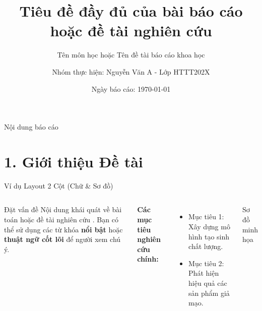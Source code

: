 \documentclass[10pt,aspectratio=169]{beamer}
\title[Tiêu đề rút gọn]{Tiêu đề đầy đủ của bài báo cáo hoặc đề tài nghiên cứu}
\subtitle{Tên môn học hoặc Tên đề tài báo cáo khoa học}
\author{Nhóm thực hiện: Nguyễn Văn A - Lớp HTTT202X}
\date{Ngày báo cáo: \today}
\newcommand{\highlight}[1]{\textcolor{accent}{\bfseries #1}}
\newcommand{\kw}[1]{\textcolor{uitblue}{\bfseries #1}}
\begin{document}
{
  \usebackgroundtemplate{}
  \begin{frame}[plain]
    \titlepage
  \end{frame}
}

\begin{frame}{Nội dung báo cáo}
\tableofcontents
\end{frame}

\section{1. Giới thiệu Đề tài}

\begin{frame}{Ví dụ Layout 2 Cột (Chữ \& Sơ đồ)}
\begin{columns}[T]
\begin{uitbox}{\faLightbulb\; Đặt vấn đề}
Nội dung khái quát về bài toán hoặc đề tài nghiên cứu \cite{goodfellow2014generative}. Bạn có thể sử dụng các từ khóa \highlight{nổi bật} hoặc \kw{thuật ngữ cốt lõi} để người xem chú ý.
\end{uitbox}
\vspace{0.2cm}
\textbf{Các mục tiêu nghiên cứu chính:}
\begin{itemize}
  \item Mục tiêu 1: Xây dựng mô hình tạo sinh chất lượng.
  \item Mục tiêu 2: Phát hiện hiệu quả các sản phẩm giả mạo.
\end{itemize}

\centering
\begin{greenbox}{\faPlayCircle\; Sơ đồ minh họa}
\centering
\end{greenbox}
\end{columns}
\end{frame}

\end{document}
